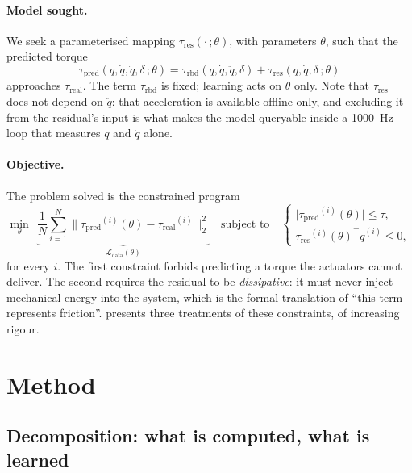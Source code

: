 \documentclass[a4paper, oneside]{article}
\newcommand{\q}{\ensuremath{q}}
\newcommand{\qd}{\ensuremath{\dot{q}}}
\newcommand{\qdd}{\ensuremath{\ddot{q}}}
\newcommand{\taurbd}{\ensuremath{\tau_{\mathrm{rbd}}}}
\newcommand{\taures}{\ensuremath{\tau_{\mathrm{res}}}}
\newcommand{\taupred}{\ensuremath{\tau_{\mathrm{pred}}}}
\newcommand{\taureal}{\ensuremath{\tau_{\mathrm{real}}}}
\begin{document}
\paragraph{Model sought.}
We seek a parameterised mapping $\taures(\cdot\,;\theta)$, with parameters
$\theta$, such that the predicted torque
%
\begin{equation}
    \taupred(\q,\qd,\qdd,\delta\,;\theta)
    = \taurbd(\q,\qd,\qdd,\delta)
    + \taures(\q,\qd,\delta\,;\theta)
    \label{eq-modele}
\end{equation}
%
approaches $\taureal$. The term $\taurbd$ is fixed; learning acts on $\theta$
only. Note that $\taures$ does not depend on $\qdd$: that acceleration is
available offline only, and excluding it from the residual's input is what
makes the model queryable inside a \SI{1000}{\hertz} loop that measures $\q$
and $\qd$ alone.

\paragraph{Objective.}
The problem solved is the constrained program
%
\begin{equation}
    \min_{\theta}\ \
    \underbrace{\frac{1}{N}\sum_{i=1}^{N}
    \bigl\| \taupred^{(i)}(\theta) - \taureal^{(i)} \bigr\|_{2}^{2}}
    _{\mathcal{L}_{\mathrm{data}}(\theta)}
    \quad \text{subject to} \quad
    \begin{cases}
        \bigl|\taupred^{(i)}(\theta)\bigr| \le \bar{\tau}, \\[2pt]
        \taures^{(i)}(\theta)^{\top} \qd^{(i)} \le 0 ,
    \end{cases}
    \label{eq-probleme}
\end{equation}
%
for every $i$. The first constraint forbids predicting a torque the actuators
cannot deliver. The second requires the residual to be \emph{dissipative}: it
must never inject mechanical energy into the system, which is the formal
translation of ``this term represents friction''. \Cref{sec-methode} presents
three treatments of these constraints, of increasing rigour.

\section{Method}
\label{sec-methode}

\subsection{Decomposition: what is computed, what is learned}
\label{sec-overview}
\end{document}
